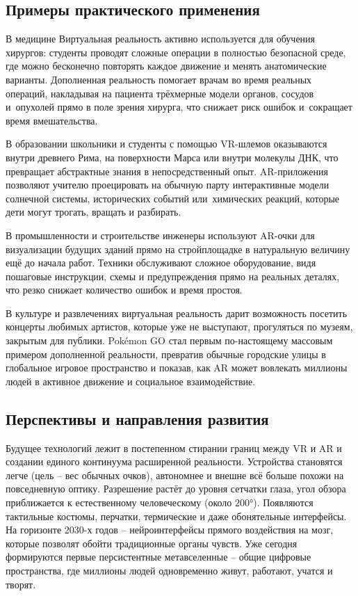 \documentclass{ou}
\begin{document}
\subsection{Примеры практического применения}
В медицине Виртуальная реальность активно используется для обучения хирургов: студенты проводят сложные операции в полностью безопасной среде, где можно бесконечно повторять каждое движение и менять анатомические варианты. Дополненная реальность помогает врачам во время реальных операций, накладывая на пациента трёхмерные модели органов, сосудов и~опухолей прямо в поле зрения хирурга, что снижает риск ошибок и~сокращает время вмешательства.

В образовании школьники и студенты с помощью VR-шлемов оказываются внутри древнего Рима, на поверхности Марса или внутри молекулы ДНК, что превращает абстрактные знания в непосредственный опыт. AR-приложения позволяют учителю проецировать на обычную парту интерактивные модели солнечной системы, исторических событий или~химических реакций, которые дети могут трогать, вращать и разбирать.

В промышленности и строительстве инженеры используют AR-очки для визуализации будущих зданий прямо на стройплощадке в натуральную величину ещё до начала работ. Техники обслуживают сложное оборудование, видя пошаговые инструкции, схемы и предупреждения прямо на реальных деталях, что резко снижает количество ошибок и время простоя.

В культуре и развлечениях виртуальная реальность дарит возможность посетить концерты любимых артистов, которые уже не выступают, прогуляться по музеям, закрытым для публики. Pokémon GO стал первым по-настоящему массовым примером дополненной реальности, превратив обычные городские улицы в глобальное игровое пространство и показав, как AR может вовлекать миллионы людей в активное движение и социальное взаимодействие.
\subsection{Перспективы и направления развития}
Будущее технологий лежит в постепенном стирании границ между VR и AR и создании единого континуума расширенной реальности. Устройства становятся легче (цель -- вес обычных очков), автономнее и внешне всё больше похожи на повседневную оптику. Разрешение растёт до уровня сетчатки глаза, угол обзора приближается к естественному человеческому (около 200°). Появляются тактильные костюмы, перчатки, термические и даже обонятельные интерфейсы. На горизонте 2030-х годов -- нейроинтерфейсы прямого воздействия на мозг, которые позволят обойти традиционные органы чувств. Уже сегодня формируются первые персистентные метавселенные -- общие цифровые пространства, где миллионы людей одновременно живут, работают, учатся и творят.
\end{document}
